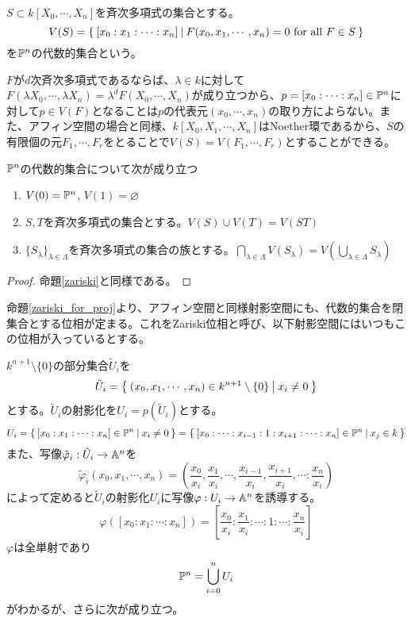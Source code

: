 \documentclass{ltjsreport}
\begin{document}
\begin{defin}
  $S\subset k[X_0,\cdots,X_n]$を斉次多項式の集合とする。
  \[
  V(S)=\left\{\:[x_0:x_1:\cdots:x_n]\:\middle|\:F(x_0,x_1,\cdots,x_n)=0\text{ for all }F\in S\:\right\}  
  \]
  を$\mathbb{P}^n$の代数的集合という。
\end{defin}

$F$が$d$次斉次多項式であるならば、$\lambda\in k$に対して$F(\lambda X_0,\cdots,\lambda X_n)=\lambda^dF(X_0,\cdots,X_n)$が成り立つから、$p=[x_0:\cdots:x_n]\in \mathbb{P}^n$に対して$p\in V(F)$となることは$p$の代表元$(x_0,\cdots,x_n)$の取り方によらない。また、アフィン空間の場合と同様、$k[X_0,X_1,\cdots,X_n]$はNoether環であるから、$S$の有限個の元$F_1,\cdots,F_r$をとることで$V(S)=V(F_1,\cdots,F_r)$とすることができる。

\begin{prop}\label{zariski_for_proj}
  $\mathbb{P}^n$の代数的集合について次が成り立つ
  \begin{enumerate}
    \item $V(0)=\mathbb{P}^n$, $V(1)=\varnothing$
    \item $S,T$を斉次多項式の集合とする。$V(S)\cup V(T)=V(ST)$
    \item $\{S_\lambda\}_{\lambda\in\Lambda}$を斉次多項式の集合の族とする。$\bigcap_{\lambda\in\Lambda}V(S_\lambda)=V(\bigcup_{\lambda\in\Lambda}S_\lambda)$
  \end{enumerate}
\end{prop}

\begin{proof}
  命題\ref{zariski}と同様である。
\end{proof}

命題\ref{zariski_for_proj}より、アフィン空間と同様射影空間にも、代数的集合を閉集合とする位相が定まる。これをZariski位相と呼び、以下射影空間にはいつもこの位相が入っているとする。

$k^{n+1}\setminus\{0\}$の部分集合$\tilde{U}_i$を
\[
\tilde{U}_i=\left\{\:(x_0,x_1,\cdots,x_n)\in k^{n+1}\setminus\{0\}\:\middle|\:x_i\neq 0\:\right\}  
\]
とする。$\tilde{U}_i$の射影化を$U_i=p(\tilde{U}_i)$とする。
\[
U_i=\left\{\:[x_0:x_1:\cdots:x_n]\in\mathbb{P}^n\:\middle|\:x_i\neq 0\:\right\}=\left\{\:[x_0:\cdots:x_{i-1}:1:x_{i+1}:\cdots:x_n]\in\mathbb{P}^n\:\middle|\:x_j\in k\:\right\} 
\]
また、写像$\tilde{\varphi}_i:\tilde{U}_i\rightarrow \mathbb{A}^n$を
\[
\tilde{\varphi}_i(x_0,x_1,\cdots,x_n)=(\frac{x_0}{x_i},\frac{x_1}{x_i},\cdots,\frac{x_{i-1}}{x_i},\frac{x_{i+1}}{x_i},\cdots:\frac{x_n}{x_i})
\]
によって定めると$\tilde{U}_i$の射影化$U_i$に写像$\varphi:U_i\rightarrow \mathbb{A}^n$を誘導する。
\[
\varphi([x_0:x_1:\cdots:x_n])=[\frac{x_0}{x_i}:\frac{x_1}{x_i}:\cdots:1:\cdots:\frac{x_n}{x_i}] 
\]
$\varphi$は全単射であり
\[
\mathbb{P}^n=\bigcup_{i=0}^nU_i  
\]
がわかるが、さらに次が成り立つ。
\end{document}

